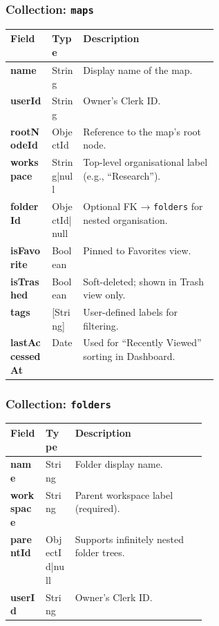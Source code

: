 \documentclass[12pt, a4paper]{article}
\begin{document}
\subsubsection{Collection: \texttt{maps}}
\begin{center}
\begin{tabularx}{\linewidth}{>{\bfseries\ttfamily}p{0.2\linewidth} p{0.15\linewidth} X}
\toprule
Field & Type & Description \\
\midrule
name & String & Display name of the map. \\
userId & String & Owner's Clerk ID. \\
rootNodeId & ObjectId & Reference to the map's root node. \\
workspace & String|null & Top-level organisational label (e.g., ``Research''). \\
folderId & ObjectId|null & Optional FK → \texttt{folders} for nested organisation. \\
isFavorite & Boolean & Pinned to Favorites view. \\
isTrashed & Boolean & Soft-deleted; shown in Trash view only. \\
tags & [String] & User-defined labels for filtering. \\
lastAccessedAt & Date & Used for ``Recently Viewed'' sorting in Dashboard. \\
\bottomrule
\end{tabularx}
\end{center}

\subsubsection{Collection: \texttt{folders}}
\begin{center}
\begin{tabularx}{\linewidth}{>{\bfseries\ttfamily}p{0.18\linewidth} p{0.15\linewidth} X}
\toprule
Field & Type & Description \\
\midrule
name & String & Folder display name. \\
workspace & String & Parent workspace label (required). \\
parentId & ObjectId|null & Supports infinitely nested folder trees. \\
userId & String & Owner's Clerk ID. \\
\bottomrule
\end{tabularx}
\end{center}
\end{document}
